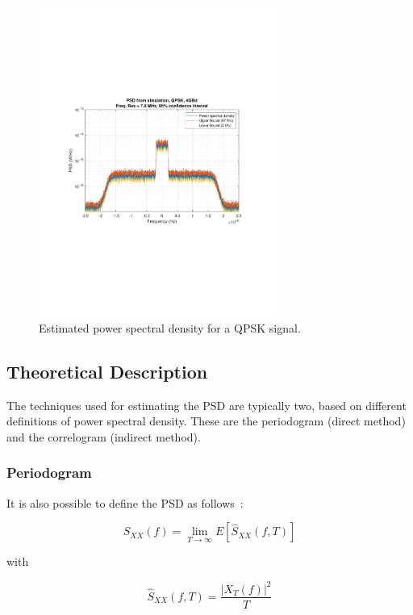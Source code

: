 \begin{refsection}
\begin{figure}[]
	\centering
	\includegraphics[clip, trim=2cm 8cm 2cm 8cm,width=0.7\textwidth]{./lib/psd_estimator/figures/qpskExample.pdf}
	\caption{Estimated power spectral density for a QPSK
	signal.\label{fig:psdExample}}
	
\end{figure}

\subsection*{Theoretical Description}\label{sec:psdEstTeor}
The techniques used for estimating the PSD are typically two, based on different
definitions of power spectral density. These are the periodogram (direct method) and the
correlogram (indirect method).

\subsubsection*{Periodogram}

It is also possible to define the PSD as follows~\cite{jeruchim06}:

\begin{equation}
	S_{XX}(f) = \lim_{T\to\infty} E \left[\hat{S}_{XX}\left(f, T\right)\right]
\end{equation}

\noindent with

\begin{equation}
	\hat{S}_{XX}(f,T) = \frac{{| X_T(f)|}^2}{T}
\end{equation}


\end{refsection}
